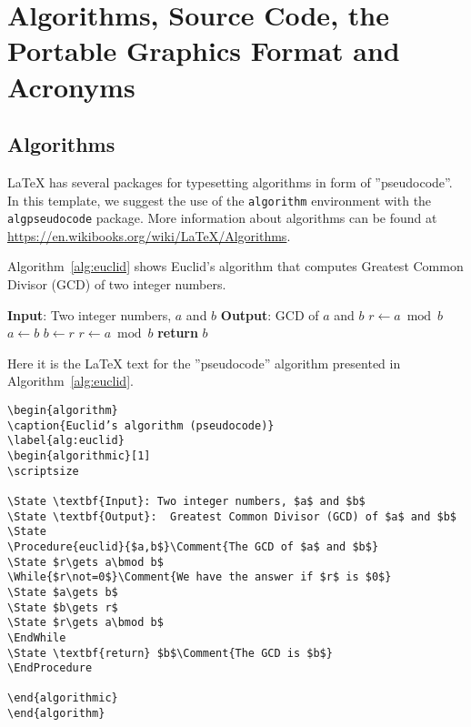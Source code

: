 
\chapter{Algorithms, Source Code, the Portable Graphics Format and Acronyms} %
\label{chap:Chapter3} %

\section{Algorithms}

 \LaTeX{}  has several packages for typesetting algorithms in form of ''pseudocode''. In this template, we suggest the use of the \verb|algorithm| environment with the \verb|algpseudocode| package. 
More information about algorithms can be found at \url{https://en.wikibooks.org/wiki/LaTeX/Algorithms}.

Algorithm~\ref{alg:euclid} shows Euclid's algorithm that computes  Greatest Common Divisor (GCD) of two integer numbers.

\begin{algorithm}[b]
\caption{Euclid’s algorithm}
\label{alg:euclid}
\begin{algorithmic}[1]
\scriptsize

\State \textbf{Input}: Two integer numbers, $a$ and $b$
\State \textbf{Output}: GCD of $a$ and $b$
\State
{}
\State $r\gets a\bmod b$
\State $a\gets b$
\State $b\gets r$
\State $r\gets a\bmod b$
\EndWhile
\State \textbf{return} $b$
\EndProcedure

\end{algorithmic}
\end{algorithm}

Here it is the \LaTeX{} text for the ''pseudocode'' algorithm presented in  Algorithm~\ref{alg:euclid}.

\begin{verbatim}
\begin{algorithm}
\caption{Euclid’s algorithm (pseudocode)}
\label{alg:euclid}
\begin{algorithmic}[1]
\scriptsize

\State \textbf{Input}: Two integer numbers, $a$ and $b$
\State \textbf{Output}:  Greatest Common Divisor (GCD) of $a$ and $b$
\State
\Procedure{euclid}{$a,b$}\Comment{The GCD of $a$ and $b$}
\State $r\gets a\bmod b$
\While{$r\not=0$}\Comment{We have the answer if $r$ is $0$}
\State $a\gets b$
\State $b\gets r$
\State $r\gets a\bmod b$
\EndWhile
\State \textbf{return} $b$\Comment{The GCD is $b$}
\EndProcedure

\end{algorithmic}
\end{algorithm}
\end{verbatim}

